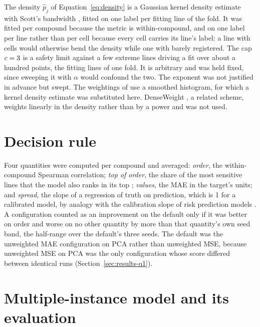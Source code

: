 The density $\hat p_j$ of Equation~\ref{eq:density} is a Gaussian kernel density estimate with Scott's
bandwidth \cite{scott1992}, fitted on one label per fitting line of the fold. It was fitted per compound because the metric is
within-compound, and on one label per line rather than per cell because every cell carries its line's
label: a line with \CellsMax{} cells would otherwise bend the density while one with \CellsMin{} barely
registered. The cap $c = 3$ is a safety limit against a few extreme lines driving a fit over about
a hundred points, the fitting lines of one fold. It is arbitrary and was held fixed, since sweeping it with $\alpha$ would confound
the two. The exponent was not justified in advance but swept. The weightings of \cite{dir} use a
smoothed histogram, for which a kernel density estimate was substituted here. DenseWeight
\cite{denseweight}, a related scheme, weights linearly in the density rather than by a power and was
not used.

\section{Decision rule}
\label{app:decision}

Four quantities were computed per compound and averaged: \emph{order}, the within-compound Spearman
correlation; \emph{top of order}, the share of the \CfgTopK{} most sensitive lines that the model also
ranks in its top \CfgTopK; \emph{values}, the MAE in the target's units; and \emph{spread}, the slope of
a regression of truth on prediction, which is 1 for a calibrated model, by analogy with the calibration
slope of risk prediction models \cite{vancalster2016}. A configuration counted as an improvement on the
default only if it was better on order and worse on no other quantity by more than that quantity's own
seed band, the half-range over the default's three seeds.
The default was the unweighted MAE configuration on PCA rather than unweighted MSE, because unweighted
MSE on PCA was the only configuration whose score differed between identical runs (Section~\ref{sec:results-q1}).

\section{Multiple-instance model and its evaluation}
\label{app:milcrit}


